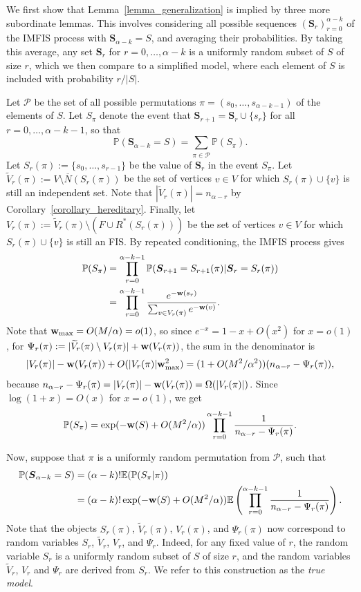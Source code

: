 \documentclass{article}
\theoremstyle{plain}
\theoremstyle{remark}
\theoremstyle{plain}
\numberwithin{equation}{section}
\renewcommand{\b}{{\bf{w}}}
\begin{document}
	We first show that Lemma~\ref{lemma_generalization} is implied by three more subordinate lemmas. This involves considering all possible sequences $(\boldsymbol{S}_r)_{r=0}^{\alpha-k}$ of the IMFIS process with $\boldsymbol{S}_{\alpha-k}=S$, and averaging their probabilities. By taking this average, any set $\boldsymbol{S}_r$ for $r=0,\ldots,\alpha-k$ is a uniformly random subset of $S$ of size $r$, which we then compare to a simplified model, where each element of $S$ is included with probability $r/|S|$.
	
	Let $\mathcal{P}$ be the set of all possible permutations $\pi=(s_0,\ldots,s_{\alpha-k-1})$ of the elements of $S$. Let $S_{\pi}$ denote the event that $\boldsymbol{S}_{r+1}=\boldsymbol{S}_r\cup\{s_r\}$ for all $r=0,\ldots,\alpha-k-1$, so that $$\mathbb{P}(\boldsymbol{S}_{\alpha-k}=S)=\sum_{\pi\in\mathcal{P}}\mathbb{P}(S_{\pi}).$$ Let $S_r(\pi):=\{s_0,\ldots,s_{r-1}\}$ be the value of $\boldsymbol{S}_r$ in the event $S_{\pi}$. Let $\widetilde{V}_r(\pi):=V\setminus\overline{N}(S_r(\pi))$ be the set of vertices $v\in V$ for which $S_r(\pi)\cup\{v\}$ is still an independent set. Note that $|\widetilde{V}_r(\pi)|=n_{\alpha-r}$ by Corollary~\ref{corollary_hereditary}. Finally, let $V_r(\pi):=\widetilde{V}_r(\pi)\setminus(F\cup R^*(S_r(\pi)))$ be the set of vertices $v\in V$ for which $S_r(\pi)\cup\{v\}$ is still an FIS. By repeated conditioning, the IMFIS process gives
	\begin{align}
		\mathbb{P}(S_{\pi})
		&=\prod_{r=0}^{\alpha-k-1}\mathbb{P}(\boldsymbol{S}_{r+1}=S_{r+1}(\pi)|\boldsymbol{S}_r=S_r(\pi))
		\\&=\prod_{r=0}^{\alpha-k-1}\frac{e^{-\b(s_r)}}{\sum_{v\in V_r(\pi)}e^{-\b(v)}}.
	\end{align}
	Note that $\b_{\max}=O(M/\alpha)=o(1)$, so since $e^{-x}=1-x+O(x^2)$ for $x=o(1)$, for $\Psi_r(\pi):=|\widetilde{V}_r(\pi)\setminus V_r(\pi)|+\b(V_r(\pi))$, the sum in the denominator is $$|V_r(\pi)|-\b(V_r(\pi))+O(|V_r(\pi)|\b_{\max}^2)=(1+O(M^2/\alpha^2))(n_{\alpha-r}-\Psi_r(\pi)),$$ because $n_{\alpha-r}-\Psi_r(\pi)=|V_r(\pi)|-\b(V_r(\pi))=\Omega(|V_r(\pi)|)$. Since $\log(1+x)=O(x)$ for $x=o(1)$, we get $$\mathbb{P}(S_{\pi})=\exp(-\b(S)+O(M^2/\alpha))\prod_{r=0}^{\alpha-k-1}\frac{1}{n_{\alpha-r}-\Psi_r(\pi)}.$$
	
	Now, suppose that $\pi$ is a uniformly random permutation from $\mathcal{P}$, such that
	\begin{align}
		\mathbb{P}(\boldsymbol{S}_{\alpha-k}=S)&=(\alpha-k)!\mathbb{E}(\mathbb{P}(S_{\pi}|\pi))
		\\&=(\alpha-k)!\exp(-\b(S)+O(M^2/\alpha))\mathbb{E}\left(\prod_{r=0}^{\alpha-k-1}\frac{1}{n_{\alpha-r}-\Psi_r(\pi)}\right).
	\end{align}
	Note that the objects $S_r(\pi)$, $\widetilde{V}_r(\pi)$, $V_r(\pi)$, and $\Psi_r(\pi)$ now correspond to random variables $S_r$, $\widetilde{V}_r$, $V_r$, and $\Psi_r$. Indeed, for any fixed value of $r$, the random variable $S_r$ is a uniformly random subset of $S$ of size $r$, and the random variables $\widetilde{V}_r$, $V_r$ and $\Psi_r$ are derived from $S_r$. We refer to this construction as the \emph{true model}.
	
\end{document}
